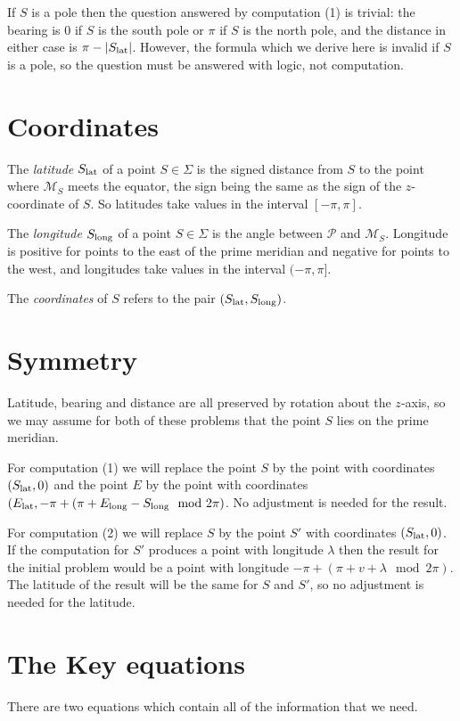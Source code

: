 \documentclass[12pt]{article}
\newcommand\lat[1]{{#1}_{\rm lat}}
\renewcommand\long[1]{{#1}_{\rm long}}
\begin{document}
If $S$ is a pole then the question answered by computation (1) is trivial: the
bearing is $0$ if $S$ is the south pole or $\pi$ if $S$ is the north pole, and
the distance in either case is $\pi - |\lat S|$.  However, the formula which we
derive here is invalid if $S$ is a pole, so the question must be answered with
logic, not computation.

\section{Coordinates}
The {\it latitude} $\lat S$ of a point $S\in\Sigma$ is the signed distance from $S$ to
the point where $\mathcal{M}_S$ meets the equator, the sign being the same
as the sign of the $z$-coordinate of $S$. So latitudes take values in the
interval $[-\pi, \pi]$.

The {\it longitude} $\long S$ of a point $S\in\Sigma$ is the angle between
$\mathcal{P}$ and $\mathcal{M}_S$.  Longitude is positive for points to the
east of the prime meridian and negative for points to the west, and longitudes
take values in the interval $(-\pi, \pi]$.

The {\it coordinates} of $S$ refers to the pair $(\lat S, \long S)$.  

\section{Symmetry}

Latitude, bearing and distance are all preserved by rotation about the $z$-axis,
so we may assume for both of these problems that the point $S$ lies on the prime
meridian.

For computation (1) we will replace the point $S$ by the point with coordinates
$(\lat S, 0)$ and the point $E$ by the point with coordinates
$(\lat E, -\pi + (\pi + \long E - \long S \mod 2\pi)$.  No adjustment is
needed for the result.

 For computation (2) we will replace $S$ by the point $S'$ with coordinates
$(\lat S, 0)$. If the computation for $S'$ produces a point with longitude
$\lambda$ then the result for the initial problem would be a point with
longitude $-\pi + (\pi + v + \lambda \mod 2\pi)$. The latitude of the result
will be the same for $S$ and $S'$, so no adjustment is needed for the latitude.

\section{The Key equations}
There are two equations which contain all of the information that we need.
\end{document}
